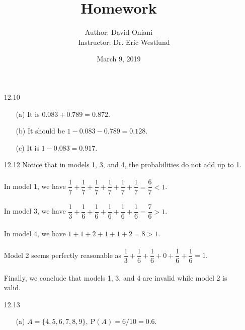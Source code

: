 \documentclass[11pt, a4paper]{article}
\title{\bf{Homework \textnumero 9}}
\author{Author: David Oniani
\\
\ \ \ Instructor: Dr. Eric Westlund}
\date{March 9, 2019}
\begin{document}
\maketitle
\begin{itemize}
\item[12.10]
\begin{itemize}
\item[(a)]
It is $0.083 + 0.789 = 0.872$.

\item[]

\item[(b)]
It should be $1 - 0.083 - 0.789 = 0.128$.

\item[]

\item[(c)]
It is $1 - 0.083 = 0.917$.
\end{itemize}

\item[]
\item[]

\item[12.12]
Notice that in models 1, 3, and 4, the probabilities do not add up to 1.\\\\
In model 1, we have $\dfrac{1}{7} + \dfrac{1}{7} + \dfrac{1}{7} + \dfrac{1}{7} + \dfrac{1}{7} + \dfrac{1}{7} = \dfrac{6}{7} < 1$.\\\\
In model 3, we have $\dfrac{1}{3} + \dfrac{1}{6} + \dfrac{1}{6} + \dfrac{1}{6} + \dfrac{1}{6} + \dfrac{1}{6} = \dfrac{7}{6} > 1$.\\\\
In model 4, we have $1 + 1 + 2 + 1 + 1 + 2 = 8 > 1$.\\\\
Model 2 seems perfectly reasonable as $\dfrac{1}{3} + \dfrac{1}{6} + \dfrac{1}{6} + 0 + \dfrac{1}{6} + \dfrac{1}{6} = 1$.\\\\
Finally, we conclude that models 1, 3, and 4 are invalid while model 2 is valid.

\item[]
\item[]

\item[12.13]
\begin{itemize}
\item[(a)]
$A = \{4, 5, 6, 7, 8, 9\}, \ \text{P}(A) = 6/10 = 0.6$.
\item[]


\end{itemize}
\end{itemize}
\end{document}

